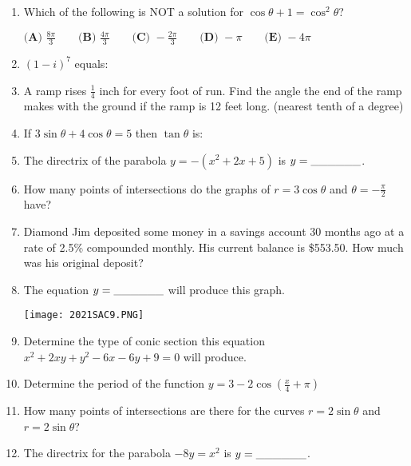 \documentclass[../uilmath.tex]{subfiles}
\begin{document}
\begin{enumerate}[label=\bfseries\arabic*.]
    \item %
    Which of the following is NOT a solution for $\cos\theta + 1 =\cos^2\theta$?

    $\textbf{(A) } \frac{8\pi}{3} \qquad \textbf{(B) } \frac{4\pi}{3} \qquad \textbf{(C) } -\frac{2\pi}{3} \qquad \textbf{(D) } -\pi \qquad \textbf{(E) } -4\pi$

    \item %
    $(1-i)^7$ equals:

    \item %
    A ramp rises $\frac{1}{4}$ inch for every foot of run. Find the angle the end of the ramp 
    makes with the ground if the ramp is 12 feet long. (nearest tenth of a degree)

    \item %
    If $3\sin\theta + 4\cos\theta = 5$ then $\tan\theta$ is: 

    \item %
    The directrix of the parabola $y=-(x^2+2x+5)$ is $y=\_\_\_\_\_\_$.

    \item %
    How many points of intersections do the graphs of $r=3\cos\theta$ and $\theta=-\frac{\pi}{2}$ have?
    
    \item %
    Diamond Jim deposited some money in a savings account 30 months ago at a rate of 2.5\% compounded monthly.
    His current balance is \$553.50. How much was his original deposit?

    \item %
    The equation $y=\_\_\_\_\_\_$ will produce this graph.
    \begin{center}
        \texttt{[image: 2021SAC9.PNG]}
    \end{center}

    \item %
    Determine the type of conic section this equation $x^2+2xy+y^2-6x-6y+9=0$ will produce.

    \item %
    Determine the period of the function $y=3-2\cos\left(\frac{x}{4}+\pi\right)$

    \item %
    How many points of intersections are there for the curves $r=2\sin\theta$ and $r=2\sin\theta$?

    \item %
    The directrix for the parabola $-8y=x^2$ is $y=\_\_\_\_\_\_$.


\end{enumerate}
\end{document}
